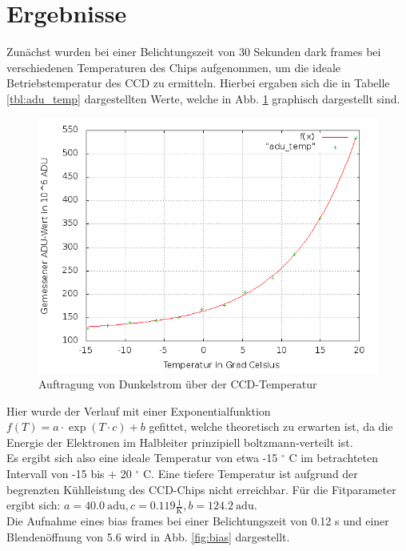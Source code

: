 \section{Ergebnisse}
Zunächst wurden bei einer Belichtungszeit von 30 Sekunden dark frames bei verschiedenen Temperaturen des Chips aufgenommen, um die ideale Betriebstemperatur des CCD zu ermitteln. Hierbei ergaben sich die in Tabelle \ref{tbl:adu_temp} dargestellten Werte, welche in Abb. \ref{fig:adu_temp} graphisch dargestellt sind. 
\begin{figure}[h!]
\centering
        \includegraphics[width=.9\textwidth]{plot_adu_temp2.png}
\caption{ Auftragung von Dunkelstrom über der CCD-Temperatur }
\label{fig:adu_temp}
\end{figure}
Hier wurde der Verlauf mit einer Exponentialfunktion $f(T) = a \cdot \exp(T \cdot c) + b$ gefittet, welche theoretisch zu erwarten ist, da die Energie der Elektronen im Halbleiter prinzipiell boltzmann-verteilt ist. \\
Es ergibt sich also eine ideale Temperatur von etwa -15 $^\circ$ C im betrachteten Intervall von -15 bis + 20 $^\circ$ C. Eine tiefere Temperatur ist aufgrund der begrenzten Kühlleistung des CCD-Chips nicht erreichbar. Für die Fitparameter ergibt sich: 
$a = 40.0\  \mathrm{adu}, c = 0.119 \frac{1}{\mathrm{K}}, b = 124.2 \ \mathrm{adu}$. \\
Die Aufnahme eines bias frames bei einer Belichtungszeit von 0.12 s und einer Blendenöffnung von 5.6 wird in Abb. \ref{fig:bias} dargestellt. 

